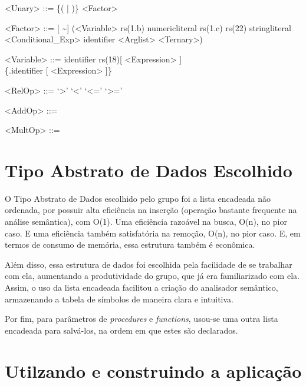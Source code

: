 \documentclass[a4paper,12pt]{article}
\begin{document}
  \begin{rules}
    \begin{numberedgrammar}
      
      <Unary> ::= \{(\lit{+} | \lit{-})\} <Factor> 

      <Factor> ::= [ \textasciitilde ] (<Variable> rs(1.b)
      \alt numericliteral rs(1.c) rs(22)
      \alt stringliteral
      \alt \lit{(}<Conditional\_Exp>\lit{)}
      \alt identifier <Arglist>
      \alt <Ternary>)

      <Variable> ::= identifier rs(18)[\lit{[} <Expression> \lit{]}]\\ \{.identifier [\lit{[} <Expression> \lit{]}]\}

      <RelOp> ::= \lit{=}
      \alt \lit{!}
      \alt `>'
      \alt `<'
      \alt `<='
      \alt `>='

      <AddOp> ::= \lit{+}
      \alt \lit{-}

      <MultOp> ::= \lit{*}
      
    \end{numberedgrammar}
    \end{rules}
\section{Tipo Abstrato de Dados Escolhido}
	O Tipo Abstrato de Dados escolhido pelo grupo foi a lista encadeada não ordenada, por possuir alta eficiência na inserção (operação bastante frequente na análise semântica), com O(1). Uma eficiência razoável na busca, O(n), no pior caso. E uma eficiência também satisfatória na remoção, O(n), no pior caso. E, em termos de consumo de memória, essa estrutura também é econômica.
    
    Além disso, essa estrutura de dados foi escolhida pela facilidade de se trabalhar com ela, aumentando a produtividade do grupo, que já era familiarizado com ela. Assim, o uso da lista encadeada facilitou a criação do analisador semântico, armazenando a tabela de símbolos de maneira clara e intuitiva.
    
    Por fim, para parâmetros de \textit{procedures} e \textit{functions}, usou-se uma outra lista encadeada para salvá-los, na ordem em que estes são declarados.
    

\section{Utilzando e construindo a aplicação}
\end{document}
